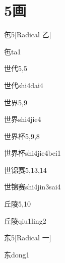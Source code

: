 
\section*{5画}

\begin{entry}{㐌}{5}[Radical 乙]
  \begin{phonetics}{㐌}{ta1}
  \end{phonetics}
\end{entry}

\begin{entry}{世代}{5,5}
  \begin{phonetics}{世代}{shi4dai4}
  \end{phonetics}
\end{entry}

\begin{entry}{世界}{5,9}
  \begin{phonetics}{世界}{shi4jie4}
  \end{phonetics}
\end{entry}

\begin{entry}{世界杯}{5,9,8}
  \begin{phonetics}{世界杯}{shi4jie4bei1}
  \end{phonetics}
\end{entry}

\begin{entry}{世锦赛}{5,13,14}
  \begin{phonetics}{世锦赛}{shi4jin3sai4}
  \end{phonetics}
\end{entry}

\begin{entry}{丘陵}{5,10}
  \begin{phonetics}{丘陵}{qiu1ling2}
  \end{phonetics}
\end{entry}

\begin{entry}{东}{5}[Radical ⼀]
  \begin{phonetics}{东}{dong1}
  \end{phonetics}
\end{entry}

